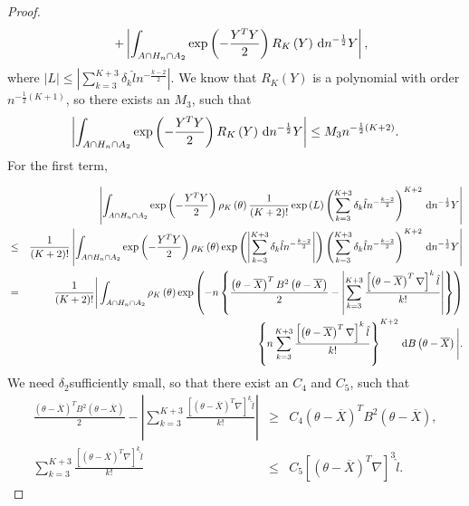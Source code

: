 \begin{proof}
\begin{eqnarray*}
 &  & +\left|\int_{A\cap H_{n}\cap A_{2}}\exp\left(-\frac{Y^{T}Y}{2}\right)R_{K}\left(Y\right)\,\mathrm{d} n^{-\frac{1}{2}}Y\right|,
\end{eqnarray*}
where $\left|L\right|\le\left|\sum_{k=3}^{K+3}\delta_{k}\hat{l}n^{-\frac{k-2}{2}}\right|$.
We know that $R_{K}\left(Y\right)$ is a polynomial with order $n^{-\frac{1}{2}\left(K+1\right)}$,
so there exists an $M_{3}$, such that 
\[
\left|\int_{A\cap H_{n}\cap A_{2}}\exp\left(-\frac{Y^{T}Y}{2}\right)R_{K}\left(Y\right)\,\mathrm{d} n^{-\frac{1}{2}}Y\right|\le M_{3}n^{-\frac{1}{2}\left(K+2\right)}.
\]
For the first term, 

\begin{eqnarray}
 &  & \left|\int_{A\cap H_{n}\cap A_{2}}\exp\left(-\frac{Y^{T}Y}{2}\right)\rho_{K}\left(\theta\right)\frac{1}{\left(K+2\right)!}\exp\left(L\right)\left(\sum_{k=3}^{K+3}\delta_{k}\hat{l}n^{-\frac{k-2}{2}}\right)^{K+2}\,\mathrm{d} n^{-\frac{1}{2}}Y\right|\label{eq:1}\\
 & \le & \frac{1}{\left(K+2\right)!}\left|\int_{A\cap H_{n}\cap A_{2}}\exp\left(-\frac{Y^{T}Y}{2}\right)\rho_{K}\left(\theta\right)\exp\left(\left|\sum_{k=3}^{K+3}\delta_{k}\hat{l}n^{-\frac{k-2}{2}}\right|\right)\left(\sum_{k=3}^{K+3}\delta_{k}\hat{l}n^{-\frac{k-2}{2}}\right)^{K+2}\,\mathrm{d} n^{-\frac{1}{2}}Y\right|\nonumber \\
 & = & \frac{1}{\left(K+2\right)!}\Bigg|\int_{A\cap H_{n}\cap A_{2}}\rho_{K}\left(\theta\right)\exp\left(-n\left\{ \frac{\left(\theta-\overline{X}\right)^{T}B^{2}\left(\theta-\overline{X}\right)}{2}-\left|\sum_{k=3}^{K+3}\frac{\left[\left(\theta-\overline{X}\right)^{T}\nabla\right]^{k}\hat{l}}{k!}\right|\right\} \right)\nonumber \\
 &  & \left\{ n\sum_{k=3}^{K+3}\frac{\left[\left(\theta-\overline{X}\right)^{T}\nabla\right]^{k}\hat{l}}{k!}\right\} ^{K+2}\,\mathrm{d} B\left(\theta-\overline{X}\right)\Bigg|.\nonumber 
\end{eqnarray}
We need $\delta_{2}$sufficiently small, so that there exist an $C_{4}$
and $C_{5}$, such that 
\begin{eqnarray*}
\frac{\left(\theta-\overline{X}\right)^{T}B^{2}\left(\theta-\overline{X}\right)}{2}-\left|\sum_{k=3}^{K+3}\frac{\left[\left(\theta-\overline{X}\right)^{T}\nabla\right]^{k}\hat{l}}{k!}\right| & \ge & C_{4}\left(\theta-\overline{X}\right)^{T}B^{2}\left(\theta-\overline{X}\right),\\
\sum_{k=3}^{K+3}\frac{\left[\left(\theta-\overline{X}\right)^{T}\nabla\right]^{k}\hat{l}}{k!} & \le & C_{5}\left[\left(\theta-\overline{X}\right)^{T}\nabla\right]^{3}\hat{l}.

\end{eqnarray*}
\end{proof}

